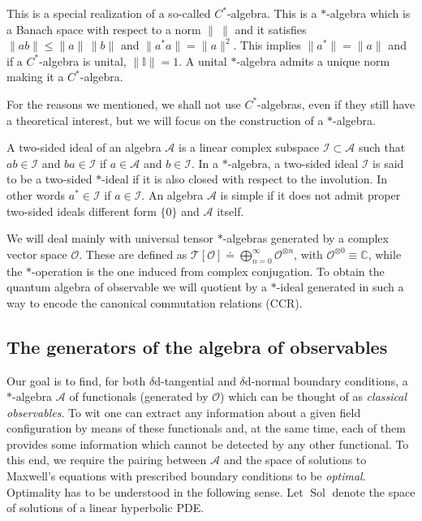 This is a special realization of a so-called $C^*$-algebra. This is a $*$-algebra which is a Banach space with respect to a norm $\|\ \|$ and it satisfies $\|ab\|\leq \|a\|\,\|b\|$ and $\|a^*a\|=\|a\|^2$. This implies $\|a^*\|=\|a\|$ and if a $C^*$-algebra is unital, $\|\mathbb{I}\|=1$. A unital $*$-algebra admits a unique norm making it a $C^*$-algebra.

For the reasons we mentioned, we shall not use $C^*$-algebras, even if they still have a theoretical interest, but we will focus on the construction of a $*$-algebra.

\begin{Definition}
	A two-sided ideal of an algebra $\mathcal{A}$ is a linear complex subspace $\mathcal{I}\subset\mathcal{A}$ such that $ab \in \mathcal{I}$ and $ba \in \mathcal{I}$ if $a \in\mathcal{A}$ and $b \in \mathcal{I}$.
	In a $*$-algebra, a two-sided ideal $\mathcal{I}$ is said to be a two-sided $*$-ideal if it is also closed with respect to the involution. In other words $a^* \in \mathcal{I}$ if $a \in \mathcal{I}$.
	An algebra $\mathcal{A}$ is simple if it does not admit proper two-sided ideals different form $\{0\}$ and $\mathcal{A}$ itself.
\end{Definition}

We will deal mainly with universal tensor $*$-algebras generated by a complex vector space $\mathcal{O}$. These are defined as $\mathcal{T}[\mathcal{O}]\doteq\bigoplus_{n=0}^\infty\mathcal{O}^{\otimes n}$, with
$\mathcal{O}^{\otimes 0}\equiv\mathbb{C}$, while the $*$-operation is the one induced from complex conjugation. To obtain the quantum algebra of observable we will quotient by a $*$-ideal generated in such a way to encode the canonical commutation relations (CCR).

\subsection{The generators of the algebra of observables}\label{Sub: generators discussion}

Our goal is to find, for both $\delta\mathrm{d}$-tangential and $\delta\mathrm{d}$-normal boundary conditions, a $*$-algebra $\mathcal{A}$ of functionals (generated by $\mathcal{O}$) which can be thought of as \emph{classical observables}. To wit one can extract any information about a given field configuration by means of these functionals and, at the same time, each of them provides some information which cannot be detected by any other functional. To this end, we require the pairing between $\mathcal{A}$ and the space of solutions to Maxwell's equations with prescribed boundary conditions to be \emph{optimal}. Optimality has to be understood in the following sense. Let $\operatorname{Sol}$ denote the space of solutions of a linear hyperbolic PDE.

